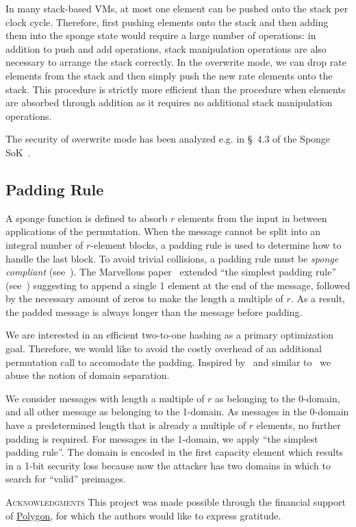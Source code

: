 \documentclass[a4paper]{article}
\begin{document}
In many stack-based VMs, at most one element can be pushed onto the stack per clock cycle. Therefore, first pushing elements onto the stack and then adding them into the sponge state would require a large number of operations: in addition to push and add operations, stack manipulation operations are also necessary to arrange the stack correctly. In the overwrite mode, we can drop rate elements from the stack and then simply push the new rate elements onto the stack. This procedure is strictly more efficient than the procedure when elements are absorbed through addition as it requires no additional stack manipulation operations.

The security of overwrite mode has been analyzed e.g. in \S~4.3 of the Sponge SoK~\cite{sponge}.

\subsection{Padding Rule}
A sponge function is defined to absorb $r$ elements from the input in between applications of the permutation. When the message cannot be split into an integral number of $r$-element blocks, a padding rule is used to determine how to handle the last block. To avoid trivial collisions, a padding rule must be {\it sponge compliant} (see~\cite[Def.~1]{sponge}). The Marvellous paper~\cite{cryptoeprint:2019/426} extended ``the simplest padding rule'' (see~\cite[Def.~2]{sponge}) suggesting to append a single 1 element at the end of the message, followed by the necessary amount of zeros to make the length a multiple of $r$. As a result, the padded message is always longer than the message before padding.

We are interested in an efficient two-to-one hashing as a primary optimization goal. Therefore, we would like to avoid the costly overhead of an additional permutation call to accomodate the padding. Inspired by~\cite{DBLP:journals/cryptography/Hirose18} and similar to~\cite{DBLP:journals/iacr/BouvierBCPV22} we abuse the notion of domain separation. 

We consider messages with length a multiple of $r$ as belonging to the 0-domain, and all other message as belonging to the 1-domain. As messages in the 0-domain have a predetermined length that is already a multiple of $r$ elements, no further padding is required. For messages in the 1-domain, we apply ``the simplest padding rule''. The domain is encoded in the first capacity element which results in a 1-bit security loss because now the attacker has two domains in which to search for ``valid'' preimages. 


\vspace{0.25cm}
\textsc{Acknowledgments} This project was made possible through the financial support of \href{https://polygon.technology/}{Polygon}, for which the authors would like to express gratitude.




\end{document}
